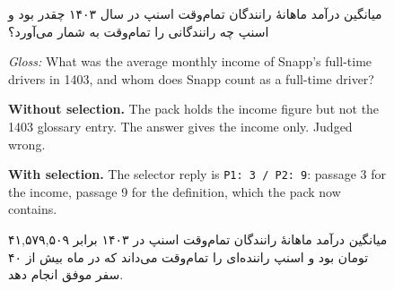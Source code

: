 \begin{figure}[t]
\centering
{}
\begin{minipage}[t]{0.495\textwidth}
\begin{tcolorbox}[exc, title={A. The selection call finds the missing definition (Persian)}]
\begin{otherlanguage}{persian}
میانگین درآمد ماهانهٔ رانندگان تمام‌وقت اسنپ در سال ۱۴۰۳ چقدر بود و اسنپ چه رانندگانی را تمام‌وقت به شمار می‌آورد؟\par
\end{otherlanguage}
{\color{cAxis}\textit{Gloss:} What was the average monthly income of Snapp's full-time drivers in 1403, and whom does Snapp count as a full-time driver?\par}
\end{tcolorbox}
\begin{tcolorbox}[exs=cHyb]
\textbf{Without selection.} The pack holds the income figure but not the 1403 glossary entry. The answer gives the income only. Judged wrong.
\end{tcolorbox}
\begin{tcolorbox}[exs=cLex]
\textbf{With selection.} The selector reply is \texttt{P1: 3 / P2: 9}: passage 3 for the income, passage 9 for the definition, which the pack now contains.\par
\begin{otherlanguage}{persian}
میانگین درآمد ماهانهٔ رانندگان تمام‌وقت اسنپ در ۱۴۰۳ برابر ۴۱,۵۷۹,۵۰۹ تومان بود و اسنپ راننده‌ای را تمام‌وقت می‌داند که در ماه بیش از ۴۰ سفر موفق انجام دهد.\par

\end{otherlanguage}
\end{tcolorbox}
\end{minipage}
\end{figure}
